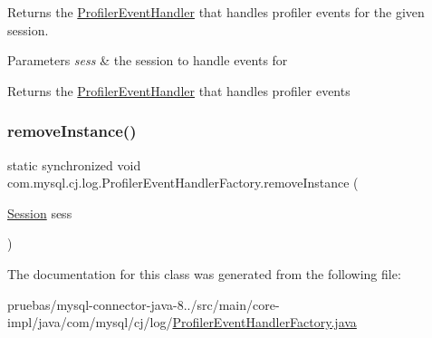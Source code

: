Returns the \mbox{\hyperlink{interfacecom_1_1mysql_1_1cj_1_1log_1_1_profiler_event_handler}{Profiler\+Event\+Handler}} that handles profiler events for the given session.


\begin{DoxyParams}{Parameters}
{\em sess} & the session to handle events for \\
\hline
\end{DoxyParams}
\begin{DoxyReturn}{Returns}
the \mbox{\hyperlink{interfacecom_1_1mysql_1_1cj_1_1log_1_1_profiler_event_handler}{Profiler\+Event\+Handler}} that handles profiler events 
\end{DoxyReturn}
\mbox{\label{classcom_1_1mysql_1_1cj_1_1log_1_1_profiler_event_handler_factory_a85c30a6754e18d4debf2888a28c20ee2}} 
\subsubsection{\texorpdfstring{remove\+Instance()}{removeInstance()}}
{\footnotesize\ttfamily static synchronized void com.\+mysql.\+cj.\+log.\+Profiler\+Event\+Handler\+Factory.\+remove\+Instance (\begin{DoxyParamCaption}\item[{\mbox{\hyperlink{interfacecom_1_1mysql_1_1cj_1_1_session}{Session}}}]{sess }\end{DoxyParamCaption})\hspace{0.3cm}{\ttfamily [static]}}



The documentation for this class was generated from the following file\+:\begin{DoxyCompactItemize}
\item 
pruebas/mysql-\/connector-\/java-\/8../src/main/core-\/impl/java/com/mysql/cj/log/\mbox{\hyperlink{_profiler_event_handler_factory_8java}{Profiler\+Event\+Handler\+Factory.\+java}}\end{DoxyCompactItemize}
